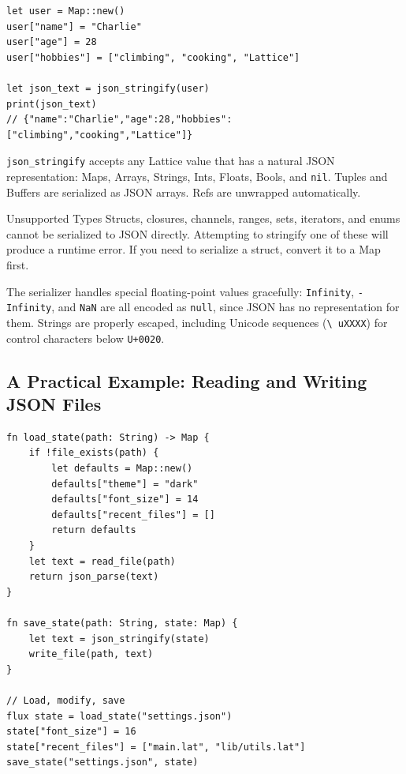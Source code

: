 \begin{lstlisting}[language=Lattice, caption={Converting Lattice values to JSON}]
let user = Map::new()
user["name"] = "Charlie"
user["age"] = 28
user["hobbies"] = ["climbing", "cooking", "Lattice"]

let json_text = json_stringify(user)
print(json_text)
// {"name":"Charlie","age":28,"hobbies":["climbing","cooking","Lattice"]}
\end{lstlisting}

\lstinline|json_stringify| accepts any Lattice value that has a natural JSON
representation: Maps, Arrays, Strings, Ints, Floats, Bools, and
\lstinline|nil|. Tuples and Buffers are serialized as JSON arrays. Refs are
unwrapped automatically.

\begin{notebox}{Unsupported Types}
Structs, closures, channels, ranges, sets, iterators, and enums cannot be
serialized to JSON directly. Attempting to stringify one of these will produce
a runtime error. If you need to serialize a struct, convert it to a Map first.
\end{notebox}

The serializer handles special floating-point values gracefully:
\lstinline|Infinity|, \lstinline|-Infinity|, and \lstinline|NaN| are all
encoded as \texttt{null}, since JSON has no representation for them. Strings
are properly escaped, including Unicode sequences (\texttt{\textbackslash
uXXXX}) for control characters below \texttt{U+0020}.

\subsection{A Practical Example: Reading and Writing JSON Files}

\begin{lstlisting}[language=Lattice, caption={Loading and saving application state as JSON}]
fn load_state(path: String) -> Map {
    if !file_exists(path) {
        let defaults = Map::new()
        defaults["theme"] = "dark"
        defaults["font_size"] = 14
        defaults["recent_files"] = []
        return defaults
    }
    let text = read_file(path)
    return json_parse(text)
}

fn save_state(path: String, state: Map) {
    let text = json_stringify(state)
    write_file(path, text)
}

// Load, modify, save
flux state = load_state("settings.json")
state["font_size"] = 16
state["recent_files"] = ["main.lat", "lib/utils.lat"]
save_state("settings.json", state)
\end{lstlisting}

